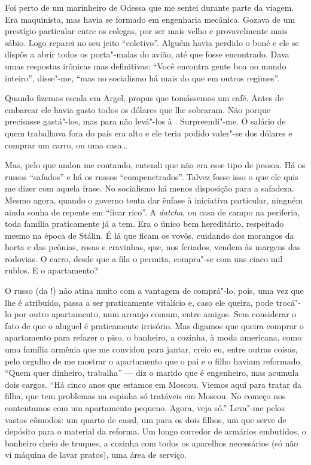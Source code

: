 Foi perto de um marinheiro de Odessa que me sentei durante parte da viagem. Era maquinista, mas havia se formado em engenharia mecânica. Gozava de um prestígio particular entre os colegas, por ser mais velho e provavelmente mais sábio. Logo reparei no seu jeito ``coletivo''. Alguém havia perdido o boné e ele se dispôs a abrir todos os porta"-malas do avião, até que fosse encontrado. Dava umas respostas irônicas mas definitivas: ``Você encontra gente boa no mundo inteiro'', disse"-me, ``mas no socialismo há mais do que em outros regimes''.

Quando fizemos escala em Argel, propus que tomássemos um café. Antes de embarcar ele havia gasto todos os dólares que lhe sobraram. Não porque precisasse gastá"-los, mas para não levá"-los à . Surpreendi"-me. O salário de quem trabalhava fora do país era alto e ele teria podido valer"-se dos dólares e comprar um carro, ou uma casa\ldots{}

Mas, pelo que andou me contando, entendi que não era esse tipo de pessoa. Há os russos ``safados'' e há os russos  ``compenetrados''. Talvez fosse isso o que ele quis me dizer com aquela frase. No socialismo há menos disposição para a safadeza. Mesmo agora, quando o governo tenta dar ênfase à iniciativa particular, ninguém ainda sonha de repente em ``ficar rico''. A \emph{datcha}, ou casa de campo na periferia, toda família praticamente já a tem. Era o único bem hereditário, respeitado mesmo na época de Stálin. É lá que ficam os vovôs, cuidando dos morangos da horta e das peônias, rosas e cravinhas, que, nos feriados, vendem às margens das rodovias. O carro, desde que a fila o permita, compra"-se com uns cinco mil rublos. E o apartamento?

O russo (da !) não atina muito com a vantagem de comprá"-lo, pois, uma vez que lhe é atribuído, passa a ser praticamente vitalício e, caso ele queira, pode trocá"-lo por outro apartamento, num arranjo comum, entre amigos. Sem considerar o fato de que o aluguel é praticamente irrisório. Mas digamos que queira comprar o apartamento para refazer o piso, o banheiro, a cozinha, à moda americana, como uma família armênia que me convidou para jantar, creio eu, entre outras coisas, pelo orgulho
de me mostrar o apartamento que o pai e o filho haviam reformado. ``Quem quer dinheiro, trabalha'' --- diz o marido que é engenheiro, mas acumula dois cargos. ``Há cinco anos que estamos em Moscou. Viemos aqui para tratar da filha, que tem problemas na espinha só tratáveis em Moscou. No começo nos contentamos com um apartamento pequeno. Agora, veja só.'' Leva"-me pelos vastos cômodos: um quarto de casal, um para os dois filhos, um que serve de depósito para o material da reforma. Um longo corredor de armários embutidos, o banheiro cheio de truques, a cozinha com todos os aparelhos necessários (só não vi máquina de lavar pratos),
uma área de serviço.

